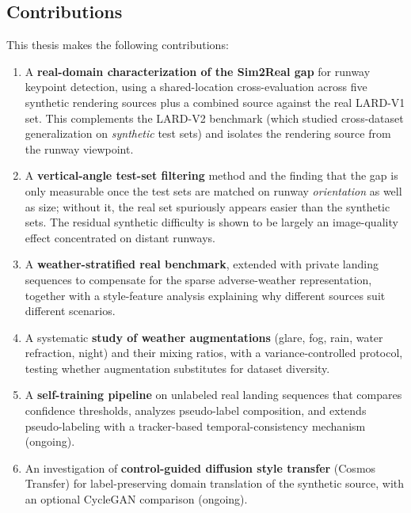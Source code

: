\subsection{Contributions}
\label{subsec:contributions}
This thesis makes the following contributions:
\begin{enumerate}
    \item A \textbf{real-domain characterization of the Sim2Real gap} for runway
    keypoint detection, using a shared-location cross-evaluation across five
    synthetic rendering sources plus a combined source against the real LARD-V1 set.
    This complements the LARD-V2 benchmark (which studied cross-dataset
    generalization on \emph{synthetic} test sets) and isolates the rendering source
    from the runway viewpoint.
    \item A \textbf{vertical-angle test-set filtering} method and the finding that
    the gap is only measurable once the test sets are matched on runway
    \emph{orientation} as well as size; without it, the real set spuriously appears
    easier than the synthetic sets. The residual synthetic difficulty is shown to be
    largely an image-quality effect concentrated on distant runways.
    \item A \textbf{weather-stratified real benchmark}, extended with private landing
    sequences to compensate for the sparse adverse-weather representation, together
    with a style-feature analysis explaining why different sources suit different
    scenarios.
    \item A systematic \textbf{study of weather augmentations} (glare, fog, rain,
    water refraction, night) and their mixing ratios, with a variance-controlled
    protocol, testing whether augmentation substitutes for dataset diversity.
    \item A \textbf{self-training pipeline} on unlabeled real landing sequences that
    compares confidence thresholds, analyzes pseudo-label composition, and extends
    pseudo-labeling with a tracker-based temporal-consistency mechanism (ongoing).
    \item An investigation of \textbf{control-guided diffusion style transfer}
    (Cosmos Transfer) for label-preserving domain translation of the synthetic
    source, with an optional CycleGAN comparison (ongoing).
\end{enumerate}

